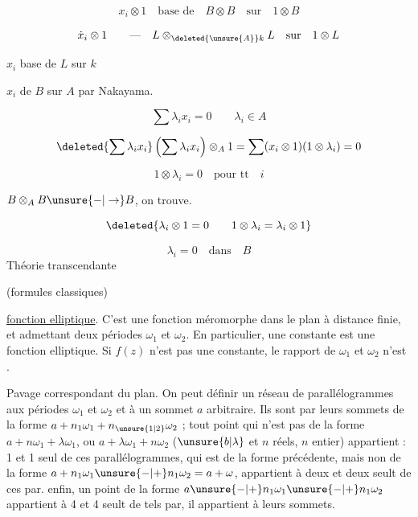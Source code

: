 \[
x_i\otimes 1\quad\text{base de}\quad B\otimes B\quad\text{sur}\quad 1\otimes B
\]

\[
\dot x_i\otimes 1\qquad\mathord{\text{---}}\quad L\otimes_{\deleted{\unsure{A}}k}L\quad\text{sur}\quad1\otimes L
\]

$x_i$ base de $L$ sur $k$

$x_i$  de $B$ sur $A$ par Nakayama.

\[
\sum\lambda_i x_i=0\qquad\lambda_i\in A
\]

\[
\deleted{\sum\lambda_i x_i}\left(\sum\lambda_i x_i\right)\otimes_A1
=\sum(x_i\otimes1)(1\otimes\lambda_i)=0
\]

\[
1\otimes\lambda_i=0\quad\text{pour }\text{tt}\quad i
\]

 $B\otimes_A B\unsure{\mathbin{-}|\to}B$, on trouve.

\[
\deleted{\lambda_i\otimes1=0\qquad1\otimes\lambda_i=\lambda_i\otimes1}
\]

\[
\lambda_i=0\quad\text{dans}\quad B
\]
Théorie transcendante

(formules classiques)

\uline{fonction elliptique}. C'est une fonction méromorphe dans le plan à distance finie, et admettant deux périodes  $\omega_1$ et $\omega_2$. En particulier, une constante est une fonction elliptique. Si $f(z)$ n'est pas une constante, le rapport de $\omega_1$ et $\omega_2$ n'est  .


Pavage correspondant du plan. On peut définir un réseau de parallélogrammes  aux périodes $\omega_1$ et $\omega_2$ et à un sommet $a$ arbitraire. Ils sont  par leurs sommets de la forme $a+n_1\omega_1+n_{\unsure{1|2}}\omega_2$ ; tout point qui n'est pas de la forme $a+n\omega_1+\lambda\omega_1$, ou $a+\lambda\omega_1+n\omega_2$ ($\unsure{b|\lambda}$ et $n$ réels, $n$ entier) appartient : 1 et 1 seul de ces parallélogrammes,   qui est de la forme précédente, mais non de la forme $a+n_1\omega_1\unsure{-|+}n_1\omega_2=a+\omega$,  appartient à deux et deux seult de ces par.   enfin, un point de la forme $a\unsure{-|+}n_1\omega_1\unsure{-|+}n_1\omega_2$ appartient à 4 et 4 seult de tels par, il appartient à leurs sommets.

